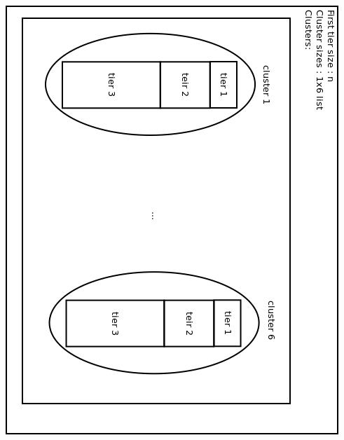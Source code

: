 \documentclass[11pt]{article}
\begin{document}
\includegraphics[width=\linewidth,height=\textheight,keepaspectratio]{cbrdiagram.png}
\newpage
\end{document}

